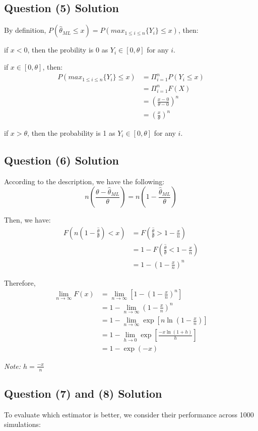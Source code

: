 \documentclass{article}
\begin{document}
\subsection{Question (5) Solution}
By definition, $P(\hat{\theta}_{ML} \leq x) = P(max_{1\leq i \leq n} \{Y_i\} \leq x)$, then:

if $x < 0$, then the probility is 0 as $Y_i \in [0, \theta] $ for any $i$.

if $x \in [0, \theta]$, then:
\begin{align*}
P(max_{1\leq i \leq n} \{Y_i\} \leq x) &= \Pi^{n}_{i=1} P(Y_i\leq x)
\\&= \Pi^n_{i=1} F(X)
\\&= (\frac{x-0}{\theta - 0})^n
\\&= (\frac{x}{\theta})^n
\end{align*}

if $x > \theta$, then the probability is 1 as $Y_i \in [0, \theta] $ for any $i$.
\subsection{Question (6) Solution}
According to the description, we have the following:
\[
n\left(\frac{\theta - \hat{\theta}_{ML}}{\theta}\right) = n\left(1 - \frac{\hat{\theta}_{ML}}{\theta}\right)
\]

Then, we have:
\begin{align*}
F\left(n\left(1 - \frac{\hat{\theta}}{\theta}\right) < x\right) 
&= F\left(\frac{\hat{\theta}}{\theta} > 1 - \frac{x}{n}\right) \\
&= 1 - F\left(\frac{\hat{\theta}}{\theta} < 1 - \frac{x}{n}\right) \\
&= 1 - \left(1 - \frac{x}{n}\right)^n
\end{align*}

Therefore,
\begin{align*}
\lim_{n \to \infty} F(x) 
&= \lim_{n \to \infty} \left[1 - \left(1 - \frac{x}{n} \right)^n \right] \\
&= 1 - \lim_{n \to \infty} \left(1 - \frac{x}{n} \right)^n \\
&= 1 - \lim_{n \to \infty} \exp \left[n \ln\left(1 - \frac{x}{n} \right)\right] \\
&= 1 - \lim_{h \to 0} \exp \left[ \frac{-x \ln(1 + h)}{h} \right] \\
&= 1 - \exp(-x)
\end{align*}

\textit{Note: $h = \frac{-x}{n}$}

\subsection{Question (7) and (8) Solution}
To evaluate which estimator is better, we consider their performance across 1000 simulations:
\end{document}
